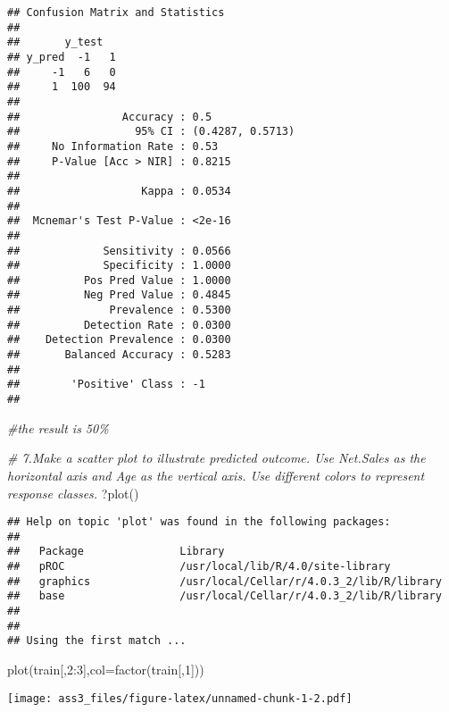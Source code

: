 \documentclass[
]{article}
\newenvironment{Shaded}{\begin{snugshade}}{\end{snugshade}}
\newcommand{\AttributeTok}[1]{\textcolor[rgb]{0.77,0.63,0.00}{#1}}
\newcommand{\CommentTok}[1]{\textcolor[rgb]{0.56,0.35,0.01}{\textit{#1}}}
\newcommand{\DecValTok}[1]{\textcolor[rgb]{0.00,0.00,0.81}{#1}}
\newcommand{\FunctionTok}[1]{\textcolor[rgb]{0.00,0.00,0.00}{#1}}
\newcommand{\NormalTok}[1]{#1}
\newcommand{\SpecialCharTok}[1]{\textcolor[rgb]{0.00,0.00,0.00}{#1}}
\begin{document}
\begin{verbatim}
## Confusion Matrix and Statistics
## 
##       y_test
## y_pred  -1   1
##     -1   6   0
##     1  100  94
##                                           
##                Accuracy : 0.5             
##                  95% CI : (0.4287, 0.5713)
##     No Information Rate : 0.53            
##     P-Value [Acc > NIR] : 0.8215          
##                                           
##                   Kappa : 0.0534          
##                                           
##  Mcnemar's Test P-Value : <2e-16          
##                                           
##             Sensitivity : 0.0566          
##             Specificity : 1.0000          
##          Pos Pred Value : 1.0000          
##          Neg Pred Value : 0.4845          
##              Prevalence : 0.5300          
##          Detection Rate : 0.0300          
##    Detection Prevalence : 0.0300          
##       Balanced Accuracy : 0.5283          
##                                           
##        'Positive' Class : -1              
## 
\end{verbatim}

\begin{Shaded}
\begin{Highlighting}[]
\CommentTok{\#the result is 50\%}


\CommentTok{\# 7.Make a scatter plot to illustrate predicted outcome. Use Net.Sales as the horizontal axis and Age as the vertical axis. Use diﬀerent colors to represent response classes.}
\NormalTok{?}\FunctionTok{plot}\NormalTok{()}
\end{Highlighting}
\end{Shaded}

\begin{verbatim}
## Help on topic 'plot' was found in the following packages:
## 
##   Package               Library
##   pROC                  /usr/local/lib/R/4.0/site-library
##   graphics              /usr/local/Cellar/r/4.0.3_2/lib/R/library
##   base                  /usr/local/Cellar/r/4.0.3_2/lib/R/library
## 
## 
## Using the first match ...
\end{verbatim}

\begin{Shaded}
\begin{Highlighting}[]
\FunctionTok{plot}\NormalTok{(train[,}\DecValTok{2}\SpecialCharTok{:}\DecValTok{3}\NormalTok{],}\AttributeTok{col=}\FunctionTok{factor}\NormalTok{(train[,}\DecValTok{1}\NormalTok{]))}
\end{Highlighting}
\end{Shaded}

\texttt{[image: ass3\_files/figure-latex/unnamed-chunk-1-2.pdf]}
\end{document}
